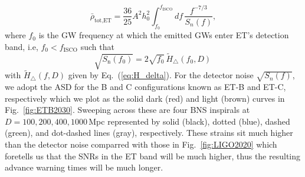 \documentclass[11pt,a4paper]{article}
\newcommand{\f}{\frac}
\newcommand{\be}{\begin{equation}}
\newcommand{\ee}{\end{equation}}
\begin{document}
%
\be
\bar\rho_{\text{tot,ET}} = \f{36}{25}A^2 h_0^2 \int_{f_0}^{f_\text{ISCO}} d f\, \f{f^{-7/3}}{S_n(f)} \label{eq:ET_SNRv2},
\ee
where $f_0$ is the GW frequency at which the emitted GWs enter ET's detection band, i.e, $f_0 < f_\text{ISCO}$ such that
%
 \be
 \sqrt{S_\text{n}(f_0)} = 2\sqrt{f_0}\, \tilde{H}_\bigtriangleup(f_0, D) \label{eq:f0_ET}\,
 \ee
with $\tilde{H}_\bigtriangleup(f, D)$ given by Eq.~(\ref{eq:H_delta}).
For the detector noise $\sqrt{S_n(f)}$, we adopt the ASD for the B and C configurations known as ET-B and ET-C, respectively \cite{Hild:2010id} which we plot as the solid dark (red) and light (brown) curves in Fig.~\ref{fig:ETB2030}.
Sweeping across these are four BNS inspirals at $D=100,200,400,1000\,$Mpc represented by solid (black), dotted (blue), dashed (green),
and dot-dashed lines (gray), respectively. These strains sit much higher than the detector noise
comparred with those in Fig.~\ref{fig:LIGO2020} which foretells us that the SNRs in the ET band will be much higher, 
thus the resulting advance warning times will be much longer.
\end{document}
